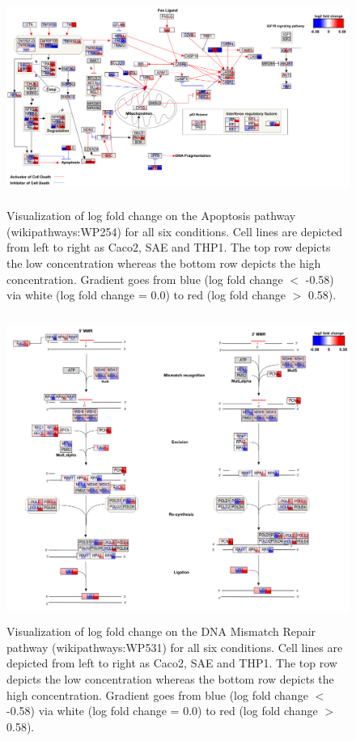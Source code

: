 \documentclass[ijms,article,submit,moreauthors,pdftex]{Definitions/mdpi}
\begin{document}
\begin{figure}[ht!]
\includegraphics[height=7cm,keepaspectratio]{figA2.png}
\caption{Visualization of log fold change on the Apoptosis pathway (wikipathways:WP254) for all six conditions.
Cell lines are depicted from left to right as Caco2, SAE and THP1. The top row depicts the low concentration whereas the bottom row depicts the high concentration. Gradient goes from blue (log fold change $<$ -0.58) via white (log fold change = 0.0) to red (log fold change $>$ 0.58).
}
\label{fig:figA3}
\end{figure}

\begin{figure}[ht!]
\includegraphics[height=10cm]{figA3.png}
\caption{Visualization of log fold change on the DNA Mismatch Repair pathway (wikipathways:WP531) for all six conditions.
Cell lines are depicted from left to right as Caco2, SAE and THP1. The top row depicts the low concentration whereas the bottom row depicts the high concentration. Gradient goes from blue (log fold change $<$ -0.58) via white (log fold change = 0.0) to red (log fold change $>$ 0.58).
}
\label{fig:figA4}
\end{figure}
\end{document}
